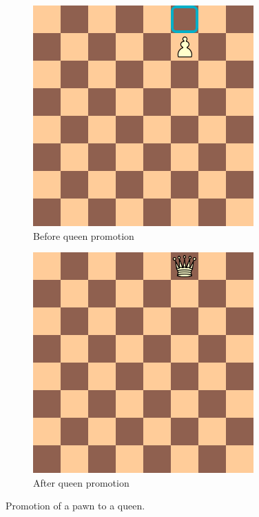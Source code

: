 \begin{figure}
\centering
\begin{subfigure}[b]{0.4\textwidth}
\includegraphics[scale=0.5]{fig/rules/promotion_before}
\caption{Before queen promotion}
\end{subfigure}
\qquad
\begin{subfigure}[b]{0.4\textwidth}
\includegraphics[scale=0.5]{fig/rules/promotion_after}
\caption{After queen promotion}
\end{subfigure}
\caption[Promotion]{Promotion of a pawn to a queen.}
\label{fig:prom}
\end{figure}

